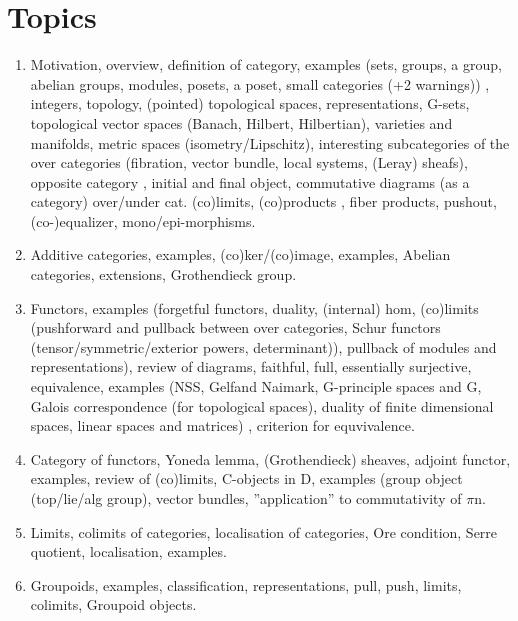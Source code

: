 \documentclass[11pt,a4paper]{article}
\begin{document}
\maketitle


\newpage
\tableofcontents
\newpage

\section{Topics}
\begin{enumerate}
  \item[(1)] Motivation, overview, deﬁnition of category, examples (sets, groups, a group, abelian groups, modules, posets, a poset, small categories (+2 warnings)) , integers, topology, (pointed) topological spaces, representations, G-sets, topological vector spaces (Banach, Hilbert, Hilbertian), varieties and manifolds, metric spaces (isometry/Lipschitz), interesting subcategories of the over categories (ﬁbration, vector bundle, local systems, (Leray) sheafs), opposite category , initial and ﬁnal object, commutative diagrams (as a category) over/under cat. (co)limits, (co)products , ﬁber products, pushout, (co-)equalizer, mono/epi-morphisms.
  \item[(2)]
    Additive categories, examples, (co)ker/(co)image, examples, Abelian categories, extensions, Grothendieck group. 
  \item[(3)]
    Functors, examples (forgetful functors, duality, (internal) hom, (co)limits (pushforward and pullback between over categories, Schur functors (tensor/symmetric/exterior powers, determinant)), pullback of modules and representations), review of diagrams, faithful, full, essentially surjective, equivalence, examples (NSS, Gelfand Naimark, G-principle spaces and G, Galois correspondence (for topological spaces), duality of ﬁnite dimensional spaces, linear spaces and matrices) , criterion for equvivalence. 
  \item[(4)]
    Category of functors, Yoneda lemma, (Grothendieck) sheaves, adjoint functor, examples, review of (co)limits, C-objects in D, examples (group object (top/lie/alg group), vector bundles, ”application” to commutativity of $\pi$n. 
  \item[(5)]
    Limits, colimits of categories, localisation of categories, Ore condition, Serre quotient, localisation, examples. 
  \item[(6)]
    Groupoids, examples, classiﬁcation, representations, pull, push, limits, colimits, Groupoid objects. 

\end{enumerate}
\end{document}
